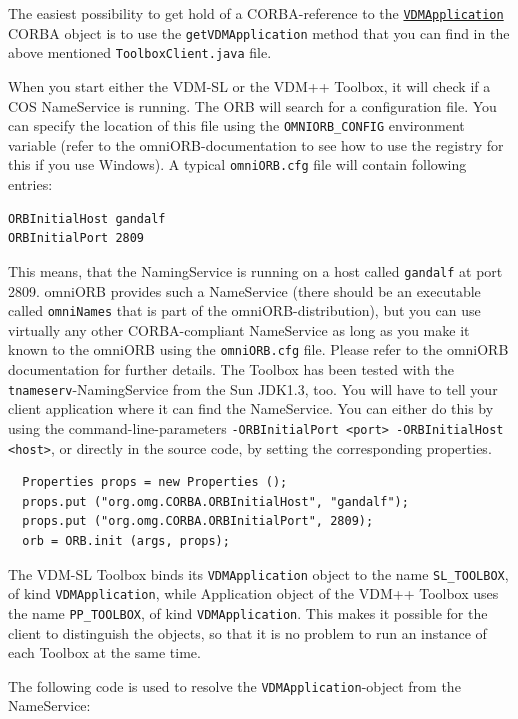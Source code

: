 \documentclass[\pformat,12pt]{article}
\newcommand{\VDMApplication}{\hyperlink{interface.VDMApplication}{VDMApplication}}
\begin{document}
The easiest possibility to get hold of a CORBA-reference to
the \texttt{\VDMApplication} CORBA object is to use the {\tt getVDMApplication} method
that you can find in the above mentioned \texttt{ToolboxClient.java} 
file.

When you start either the VDM-SL or the VDM++ Toolbox, it will
check if a COS NameService is running. The ORB will search for
a configuration file. You can specify the location of this
file using the {\tt OMNIORB\_CONFIG} environment variable (refer
to the omniORB-documentation to see how to use the registry for
this if you use Windows). A typical {\tt omniORB.cfg} file
will contain following entries:

\begin{verbatim}
ORBInitialHost gandalf
ORBInitialPort 2809
\end{verbatim}

This means, that the NamingService is running on a host
called {\tt gandalf} at port 2809.
omniORB provides such a
NameService (there should be an executable called \texttt{omniNames}
that is part of the omniORB-distribution), but you can use
virtually any other CORBA-compliant NameService as long as you
make it known to the omniORB using the \texttt{omniORB.cfg} file.
Please refer to the omniORB documentation for further details.
The Toolbox has been tested with the {\tt tnameserv}-NamingService
from the Sun JDK1.3, too. You will have to tell your client application
where it can find the NameService. You can either do this by using
the command-line-parameters {\tt -ORBInitialPort <port> -ORBInitialHost <host>},
or directly in the source code, by setting the corresponding properties.

\begin{verbatim}
  Properties props = new Properties ();
  props.put ("org.omg.CORBA.ORBInitialHost", "gandalf");
  props.put ("org.omg.CORBA.ORBInitialPort", 2809);
  orb = ORB.init (args, props);
\end{verbatim}

The VDM-SL Toolbox binds its {\tt VDMApplication} object to the name
{\tt SL\_TOOLBOX}, of kind {\tt VDMApplication}, while Application object of the
VDM++ Toolbox uses the name {\tt PP\_TOOLBOX}, of kind {\tt VDMApplication}. This
makes it possible for the client to distinguish the objects, so
that it is no problem to run an instance of each Toolbox at the
same time.

The following code is used to resolve the {\tt VDMApplication}-object from the
NameService:
\end{document}
